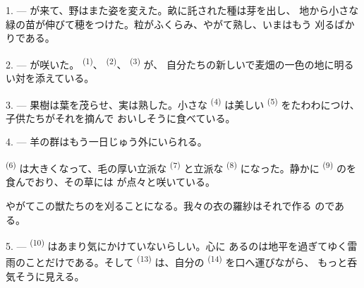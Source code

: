 %


\VUsaut{5.0mm}
\VUsaut{3.0mm}
\VUsaut{3.0mm}
\VUsaut{4.0mm}
\VUsaut{3.0mm}

1. --- が来て、野はまた姿を変えた。畝に託された種は芽を出し、
地から小さな緑の苗が伸びて穂をつけた。粒がふくらみ、やがて熟し、いまはもう
刈るばかりである。

2. --- が咲いた。 \textsuperscript{(1)}、
 \textsuperscript{(2)}、 \textsuperscript{(3)} が、
自分たちの新しいで麦畑の一色の地に明るい対を添えている。

3. --- 果樹は葉を茂らせ、実は熟した。小さな \textsuperscript{(4)}
は美しい \textsuperscript{(5)} をたわわにつけ、子供たちがそれを摘んで
おいしそうに食べている。

4. --- 羊の群はもう一日じゅう外にいられる。

 \textsuperscript{(6)} は大きくなって、毛の厚い立派な
\textsuperscript{(7)} と立派な \textsuperscript{(8)} になった。静かに
 \textsuperscript{(9)} のを食んでおり、その草には
が点々と咲いている。

やがてこの獣たちのを刈ることになる。我々の衣の羅紗はそれで作る
のである。

\VUsaut{5.0mm}
\VUsaut{3.4mm}

5. ---  \textsuperscript{(10)} はあまり気にかけていないらしい。心に
あるのは地平を過ぎてゆく雷雨のことだけである。そして
\textsuperscript{(13)} は、自分の \textsuperscript{(14)} を口へ運びながら、
もっと呑気そうに見える。

